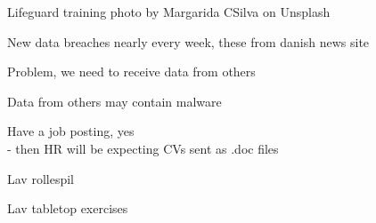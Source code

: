 \documentclass[Screen16to9,17pt]{foils}
\begin{document}
Lifeguard training photo by Margarida CSilva on Unsplash



New data breaches nearly every week, these from danish news site 

Problem, we need to receive data from others

Data from others may contain malware

Have a job posting, yes\\
- then HR will be expecting CVs sent as .doc files



\begin{list2}
\item Lav rollespil
\item Lav tabletop exercises
\end{list2}



\begin{center}
\hlkbig

\myname

\end{center}
\end{document}
